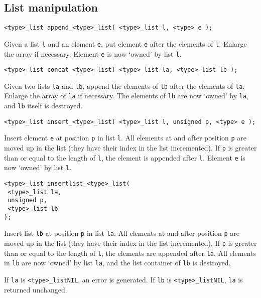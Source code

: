 \subsection{List manipulation}
\begin{verbatim}
<type>_list append_<type>_list( <type>_list l, <type> e );
\end{verbatim}
\begin{desc}
Given a list {\tt l} and an element {\tt e},
put element {\tt e} after the elements of {\tt l}.
Enlarge the array if necessary.
Element {\tt e} is now `owned' by list {\tt l}.
\end{desc}
\begin{verbatim}
<type>_list concat_<type>_list( <type>_list la, <type>_list lb );
\end{verbatim}
\begin{desc}
Given two lists {\tt la} and {\tt lb},
append the elements of {\tt lb} after the elements of {\tt la}.
Enlarge the array of {\tt la} if necessary.
The elements of {\tt lb} are now `owned' by {\tt la},
and {\tt lb} itself is destroyed.
\end{desc}
\begin{verbatim}
<type>_list insert_<type>_list( <type>_list l, unsigned p, <type> e );
\end{verbatim}
\begin{desc}
Insert element {\tt e} at position {\tt p} in list {\tt l}.
All elements at and after position {\tt p} are moved up in the list
(they have their index in the list incremented).
If {\tt p} is greater than or equal to the length of {\tt l},
the element is appended after {\tt l}.
Element {\tt e} is now `owned' by list {\tt l}.
\end{desc}
\begin{verbatim}
<type>_list insertlist_<type>_list(
 <type>_list la,
 unsigned p,
 <type>_list lb
);
\end{verbatim}
\begin{desc}
Insert list {\tt lb} at position {\tt p} in list {\tt la}.
All elements at and after position {\tt p} are moved up in the list
(they have their index in the list incremented).
If {\tt p} is greater than or equal to the length of {\tt l},
the elements are appended after {\tt la}.
All elements in {\tt lb} are now `owned' by list {\tt la}, and the
list container of {\tt lb} is destroyed.
\par
If {\tt la} is \verb'<type>_listNIL', an error is generated.
If {\tt lb} is \verb'<type>_listNIL', {\tt la} is returned unchanged.
\end{desc}
